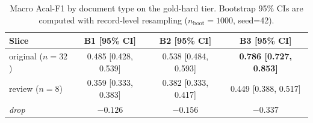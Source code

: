 \documentclass{article}
\begin{document}
\begin{table}[t]
\centering
\caption{Macro Acal-F1 by document type on the gold-hard tier. Bootstrap 95\% CIs are computed with record-level resampling ($n_\mathrm{boot}=1000$, seed=42).}
\label{tab:slice_doc}
\small
\setlength{\tabcolsep}{4pt}
\begin{tabular}{@{}lccc@{}}
\toprule
\textbf{Slice} & \textbf{B1 [95\% CI]} & \textbf{B2 [95\% CI]} & \textbf{B3 [95\% CI]} \\
\midrule
original ($n=32$) & 0.485 [0.428, 0.539] & 0.538 [0.484, 0.593] & \textbf{0.786 [0.727, 0.853]} \\
review ($n=8$)    & 0.359 [0.333, 0.383] & 0.382 [0.333, 0.417] & 0.449 [0.388, 0.517] \\
\midrule
\emph{drop} & $-0.126$ & $-0.156$ & $\mathbf{-0.337}$ \\
\bottomrule
\end{tabular}
\end{table}





\end{document}
